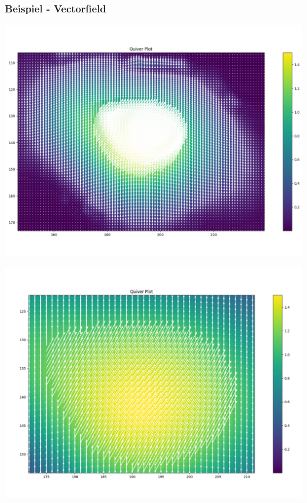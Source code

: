 \begin{frame}
	\frametitle{Beispiel - Vectorfield}
	\begin{minipage}{0.49\textwidth}
		\includegraphics[width=\linewidth]{../Pictures/preferred_1_zoom.png}
	\end{minipage}
	\begin{minipage}{0.49\textwidth}
		\includegraphics[width=\linewidth]{../Pictures/preferred_1_zoom2.png}
	\end{minipage}
\end{frame}
